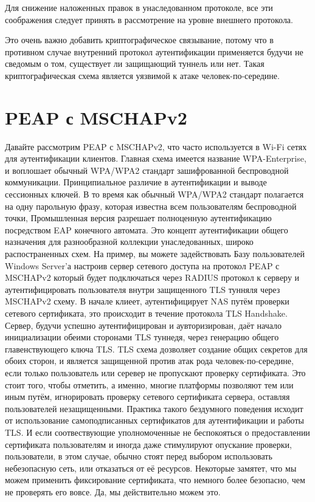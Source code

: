 \documentclass{extarticle}
\begin{document}
Для снижение наложенных правок в унаследованном протоколе,
все эти соображения следует принять в рассмотрение
на уровне внешнего протокола.

Это очень важно добавить криптографическое связывание,
потому что в противном случае внутренний протокол
аутентификации применяется будучи не сведомым о том,
существует ли защищающий туннель или нет.
Такая криптографическая схема является уязвимой к атаке
человек-по-середине.

\section{PEAP с MSCHAPv2}

Давайте рассмотрим PEAP с MSCHAPv2, что часто используется
в Wi-Fi сетях для аутентификации клиентов.
Главная схема имеется название WPA-Enterprise,
и воплошает обычный WPA/WPA2 стандарт зашифрованной беспроводной коммуникации.
Принципиальное различие в аутентификации и выводе сессионных ключей.
В то время как обычный WPA/WPA2 стандарт полагается на одну парольную фразу,
которая известна всем пользователям беспроводной точки,
Промышленная версия разрешает полноценную аутентификацию посредством
EAP конечного автомата.
Это концепт аутентификации общего назначения для разнообразной коллекции
унаследованных, широко распостраненных схем.
На пример, вы можете задействовать Базу пользователей Windows Server'а
настроив сервер сетевого доступа на протокол PEAP с MSCHAPv2
который будет подключаться через RADIUS протокол к серверу и аутентифицировать
пользователя внутри защищенного TLS тунняля через MSCHAPv2 схему.
В начале клиеет, аутентифицирует NAS путём проверки сетевого сертификата,
это происходит в течение протокола TLS Handshake.
Сервер, будучи успешно аутентифицирован и аувторизирован, даёт начало
инициализации обеими сторонами TLS туннедя,
через генерацию общего главенствующего ключа TLS.
TLS схема дозволяет создание общих секретов для обоих сторон,
и является защищенной против атак рода человек-по-середине,
если только пользователь или серевер не пропускают проверку сертификата.
Это стоит того, чтобы отметить, а именно, многие платформы
позволяют тем или иным путём, игнорировать проверку сетевого сертификата сервера,
оставляя пользователей незащищенными.
Практика такого бездумного поведения исходит от использование
самоподписанных сертификатов для аутентификации и работы TLS.
И если соотвествующие уполномоченные не беспокояться о предоставлении
сертификата пользователям
и иногда даже стимулируют опускание проверки,
пользователи, в этом случае, обычно стоят перед выбором
использовать небезопасную сеть,
или отказаться от её ресурсов.
Некоторые замятет, что мы можем применить фиксирование сертификата,
что немного более безопасно, чем не проверять его вовсе.
Да, мы действительно можем это.
\end{document}
